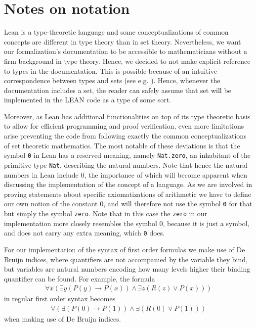 \chapter{Notes on notation}
Lean is a type-theoretic language and some conceptualizations of common concepts are different in type theory than in set theory. Nevertheless, we want our formalization's documentation to be accessible to mathematicians without a firm background in type theory. Hence, we decided to not make explicit reference to types in the documentation. This is possible because of an intuitive correspondence between types and sets (see e.g. \cite{nederpelt1994}). Hence, whenever the documentation includes a set, the reader can safely assume that set will be implemented in the LEAN code as a type of some sort. 

Moreover, as Lean has additional functionalities on top of its type theoretic basis to allow for efficient programming and proof verification, even more limitations arise preventing the code from following exactly the common conceptualizations of set theoretic mathematics. The most notable of these deviations is that the symbol \lstinline{0} in Lean has a reserved meaning, namely \lstinline{Nat.zero}, an inhabitant of the primitive type \lstinline{Nat}, describing the natural numbers. Note that hence the natural numbers in Lean include 0, the importance of which will become apparent when discussing the implementation of the concept of a language. As we are involved in proving statements about specific axiomatizations of arithmetic we have to define our own notion of the constant 0, and will therefore not use the symbol \lstinline{0} for that but simply the symbol \lstinline{zero}. Note that in this case the \lstinline{zero} in our implementation more closely resembles the symbol 0, because it is just a symbol, and does not carry any extra meaning, which \lstinline{0} does.

For our implementation of the syntax of first order formulas we make use of De Bruijn indices, where quantifiers are not accompanied by the variable they bind, but variables are natural numbers encoding how many levels higher their binding quantifier can be found. For example, the formula 
\begin{align*}
    \forall x (\exists y (P(y) \to P(x)) \land \exists z(R(z) \lor P(x)))
\end{align*}
in regular first order syntax becomes
\begin{align*}
    \forall (\exists (P(0) \to P(1)) \land \exists (R(0) \lor P(1)))
\end{align*}
when making use of De Bruijn indices.